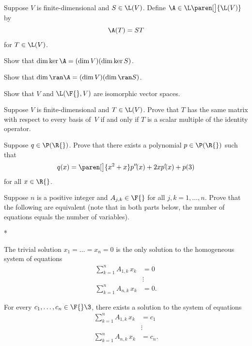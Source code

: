 \exercise
Suppose $V$ is finite-dimensional and $S \in \L(V)$. Define $\A \in \L\paren[\big]{\L(V)}$ by
\[
\A(T) = ST
\vspace{-6bp}
\]
for $T \in \L(V)$.
\begin{subtheorem}
\item
Show that $\dim \ker \A  = (\dim V)(\dim \ker S)$.
\item
Show that $\dim \ran \A  = (\dim V)(\dim \ran S)$.
\end{subtheorem}
\exercisesubtheoremend


\exercise
Show that $V$ and $\L(\F{}, V)$ are isomorphic vector spaces.


\exercise
Suppose $V$ is finite-dimensional and $T \in \L(V)$. Prove that $T$ has the same matrix with respect to every basis of~$V$ if and only if $T$ is a scalar multiple of the identity operator.


\exercise
Suppose $q \in \P(\R{})$. Prove that there exists a polynomial $p \in \P(\R{})$ such that
\[
q(x) = \paren[\big]{x^2 + x} p'' \! (x) +2x p' \! (x) + p(3)
\]
for all $x \in \R{}$.


\exercise
Suppose $n$ is a positive integer and $A_{j,k} \in \F{}$ for all $j,k = 1, \dots, n$.
Prove that the following are equivalent (note that in both parts below, the number of equations equals the number of  variables).
\begin{subtheorem}*
\item
The trivial solution $x_1 = \dots = x_n = 0$ is the only solution to the
homogeneous system of equations
\begin{align*}
\sum_{k=1}^n A_{1,k} \, x_k &= 0 \\
& \vdots \\
\sum_{k=1}^n A_{n,k} \, x_k &= 0.
\end{align*}

\item
For every $c_1, \dots, c_n \in \F{}\3$, there exists a solution to the system of
equations
\begin{align*}
\sum_{k=1}^n A_{1,k} \, x_k &= c_1 \\
& \vdots \\
\sum_{k=1}^n A_{n,k} \, x_k &= c_n.
\end{align*}
\end{subtheorem}

